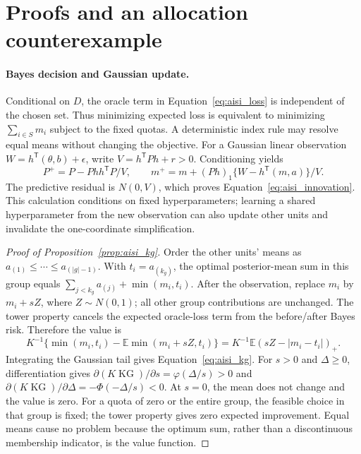 \section{Proofs and an allocation counterexample}
\label{app:aisi_theory}

\paragraph{Bayes decision and Gaussian update.}
Conditional on $D$, the oracle term in Equation~\eqref{eq:aisi_loss} is
independent of the chosen set. Thus minimizing expected loss is equivalent
to minimizing $\sum_{i\in S}m_i$ subject to the fixed quotas. A deterministic
index rule may resolve equal means without changing the objective.
For a Gaussian linear observation $W=h^{\mathsf T}(\theta,b)+\epsilon$,
write $V=h^{\mathsf T}Ph+r>0$. Conditioning yields
\[
 P^+=P-Phh^{\mathsf T}P/V,\qquad
 m^+=m+(Ph)_1\{W-h^{\mathsf T}(m,a)\}/V.
\]
The predictive residual is $N(0,V)$, which proves
Equation~\eqref{eq:aisi_innovation}. This calculation conditions on fixed
hyperparameters; learning a shared hyperparameter from the new observation
can also update other units and invalidate the one-coordinate simplification.

\begin{proof}[Proof of Proposition~\ref{prop:aisi_kg}]
Order the other units' means as $a_{(1)}\le\cdots\le a_{(|g|-1)}$.
With $t_i=a_{(k_g)}$, the optimal posterior-mean sum in this group equals
$\sum_{j<k_g}a_{(j)}+\min(m_i,t_i)$. After the observation, replace
$m_i$ by $m_i+sZ$, where $Z\sim N(0,1)$; all other group contributions
are unchanged. The tower property cancels the expected oracle-loss term
from the before/after Bayes risk. Therefore the value is
\[
 K^{-1}\{\min(m_i,t_i)-\mathbb E\min(m_i+sZ,t_i)\}
 =K^{-1}\mathbb E(sZ-|m_i-t_i|)_+.
\]
Integrating the Gaussian tail gives Equation~\eqref{eq:aisi_kg}.
For $s>0$ and $\Delta\ge0$, differentiation gives
$\partial(K\operatorname{KG})/\partial s=\varphi(\Delta/s)>0$ and
$\partial(K\operatorname{KG})/\partial\Delta=-\Phi(-\Delta/s)<0$.
At $s=0$, the mean does not change and the value is zero. For a quota
of zero or the entire group, the feasible choice in that group is fixed;
the tower property gives zero expected improvement. Equal means cause no
problem because the optimum sum, rather than a discontinuous membership
indicator, is the value function.
\end{proof}

